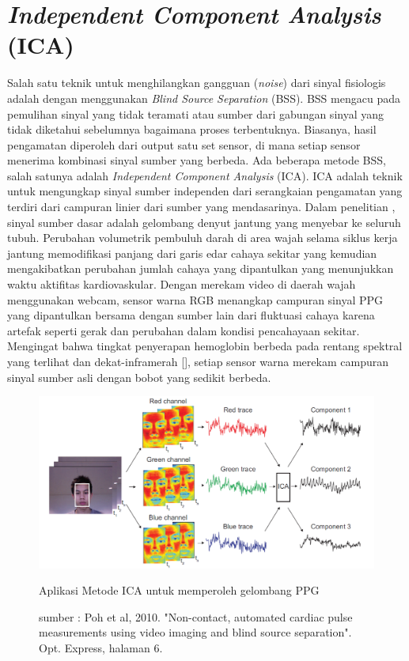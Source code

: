 \section{\textit{Independent Component Analysis} (ICA)}
Salah satu teknik untuk menghilangkan gangguan (\textit{noise}) dari sinyal fisiologis adalah dengan menggunakan \textit{Blind Source Separation} (BSS). BSS mengacu pada pemulihan sinyal yang tidak teramati atau sumber dari gabungan sinyal yang tidak diketahui sebelumnya bagaimana proses terbentuknya. Biasanya, hasil pengamatan diperoleh dari output satu set sensor, di mana setiap sensor menerima kombinasi sinyal sumber yang berbeda. Ada beberapa metode BSS, salah satunya adalah \textit{Independent Component Analysis} (ICA). ICA adalah teknik untuk mengungkap sinyal sumber independen dari serangkaian pengamatan yang terdiri dari campuran linier dari sumber yang mendasarinya. Dalam penelitian \citet{Poh2010,Poh2011}, sinyal sumber dasar adalah gelombang denyut jantung yang menyebar ke seluruh tubuh. Perubahan volumetrik pembuluh darah di area wajah selama siklus kerja jantung memodifikasi panjang dari garis edar cahaya sekitar yang kemudian mengakibatkan perubahan jumlah cahaya yang dipantulkan yang menunjukkan waktu aktifitas kardiovaskular. Dengan merekam video di daerah wajah menggunakan webcam, sensor warna RGB menangkap campuran sinyal PPG yang dipantulkan bersama dengan sumber lain dari fluktuasi cahaya karena artefak seperti gerak dan perubahan dalam kondisi pencahayaan sekitar. Mengingat bahwa tingkat penyerapan hemoglobin berbeda pada rentang spektral yang terlihat dan dekat-inframerah [\citet{Zijlstra1991}], setiap sensor warna merekam campuran sinyal sumber asli dengan bobot yang sedikit berbeda.

\begin{figure}[ht]
\vspace{0.5em}
\centering
 \includegraphics[width=\textwidth]{ICA}
 \caption{Aplikasi Metode ICA untuk memperoleh gelombang PPG}
  \caption*{sumber : Poh et al, 2010. "Non-contact, automated cardiac pulse measurements using video imaging and blind source separation". Opt. Express, halaman 6.}
 \label{fig:ICA}   
\end{figure}

